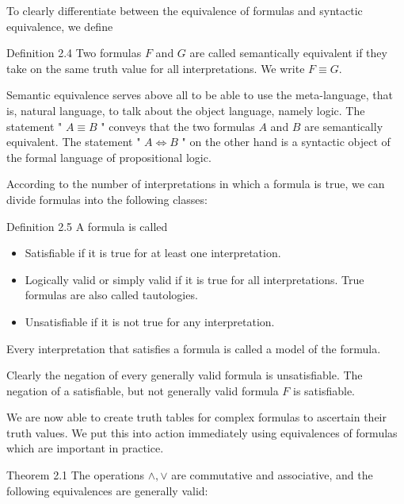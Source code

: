 \documentclass[10pt]{book}
\begin{document}
To clearly differentiate between the equivalence of formulas and syntactic equivalence, we define

Definition 2.4 Two formulas $F$ and $G$ are called semantically equivalent if they take on the same truth value for all interpretations. We write $F \equiv G$.

Semantic equivalence serves above all to be able to use the meta-language, that is, natural language, to talk about the object language, namely logic. The statement " $A \equiv B$ " conveys that the two formulas $A$ and $B$ are semantically equivalent. The statement " $A \Leftrightarrow B$ " on the other hand is a syntactic object of the formal language of propositional logic.

According to the number of interpretations in which a formula is true, we can divide formulas into the following classes:

Definition 2.5 A formula is called

\begin{itemize}
  \item Satisfiable if it is true for at least one interpretation.
  \item Logically valid or simply valid if it is true for all interpretations. True formulas are also called tautologies.
  \item Unsatisfiable if it is not true for any interpretation.
\end{itemize}

Every interpretation that satisfies a formula is called a model of the formula.

Clearly the negation of every generally valid formula is unsatisfiable. The negation of a satisfiable, but not generally valid formula $F$ is satisfiable.

We are now able to create truth tables for complex formulas to ascertain their truth values. We put this into action immediately using equivalences of formulas which are important in practice.

Theorem 2.1 The operations $\wedge, \vee$ are commutative and associative, and the following equivalences are generally valid:
\end{document}
